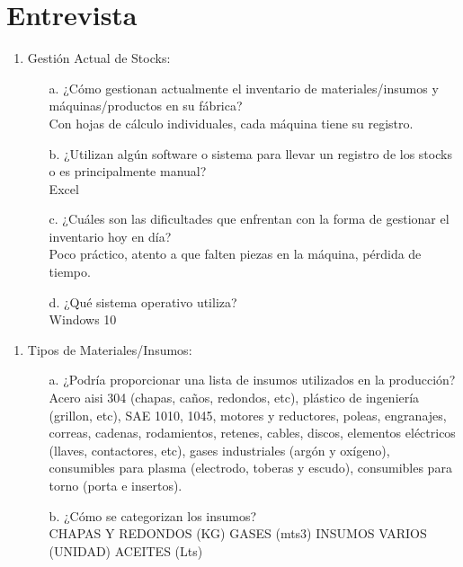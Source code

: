 \documentclass{article}
\begin{document}
\clearpage

\section{Entrevista}
    \begin{enumerate}
        \item Gestión Actual de Stocks:
            \begin{enumerate}[label=\Alph*.]
                \item[a.] ¿Cómo gestionan actualmente el inventario de materiales/insumos y máquinas/productos en su fábrica? \\
                    Con hojas de cálculo individuales, cada máquina tiene su registro.
                \item[b.] ¿Utilizan algún software o sistema para llevar un registro de los stocks o es principalmente manual? \\
                    Excel
                \item[c.] ¿Cuáles son las dificultades que enfrentan con la forma de gestionar el inventario hoy en día? \\
                    Poco práctico, atento a que falten piezas en la máquina, pérdida de tiempo. 
                \item[d.] ¿Qué sistema operativo utiliza? \\
                    Windows 10
            \end{enumerate}
    \end{enumerate}
    
    \begin{enumerate}[start=2]
        \item Tipos de Materiales/Insumos:
            \begin{enumerate}[label=\Alph*.]
            \item[a.]  ¿Podría proporcionar una lista de insumos utilizados en la producción? \\
                Acero aisi 304 (chapas, caños, redondos, etc), plástico de ingeniería (grillon, etc), SAE 1010, 1045, motores y reductores, poleas, engranajes, correas, cadenas, rodamientos, retenes, cables, discos, elementos eléctricos (llaves, contactores, etc), gases industriales (argón y oxígeno), consumibles para plasma (electrodo, toberas y escudo), consumibles para torno (porta e insertos).
            \item[b.]  ¿Cómo se categorizan los insumos? \\       
                CHAPAS Y REDONDOS (KG) GASES (mts3) INSUMOS VARIOS (UNIDAD) ACEITES (Lts)
            \end{enumerate}
    \end{enumerate}
\end{document}
